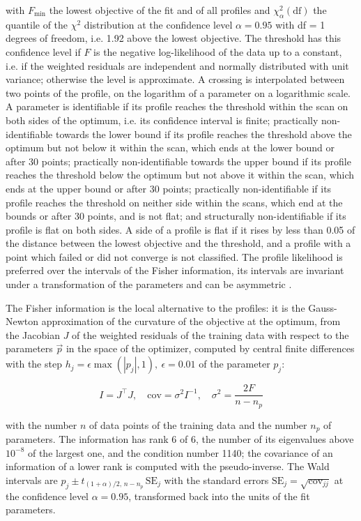 with $F_{\min}$ the lowest objective of the fit and of all profiles and $\chi^2_{\alpha}(\mathrm{df})$ the quantile of the $\chi^2$ distribution at the confidence level $\alpha = 0.95$ with df = 1 degrees of freedom, i.e. 1.92 above the lowest objective. The threshold has this confidence level if $F$ is the negative log-likelihood of the data up to a constant, i.e. if the weighted residuals are independent and normally distributed with unit variance; otherwise the level is approximate. A crossing is interpolated between two points of the profile, on the logarithm of a parameter on a logarithmic scale. A parameter is identifiable if its profile reaches the threshold within the scan on both sides of the optimum, i.e. its confidence interval is finite; practically non-identifiable towards the lower bound if its profile reaches the threshold above the optimum but not below it within the scan, which ends at the lower bound or after 30 points; practically non-identifiable towards the upper bound if its profile reaches the threshold below the optimum but not above it within the scan, which ends at the upper bound or after 30 points; practically non-identifiable if its profile reaches the threshold on neither side within the scans, which end at the bounds or after 30 points, and is not flat; and structurally non-identifiable if its profile is flat on both sides. A side of a profile is flat if it rises by less than 0.05 of the distance between the lowest objective and the threshold, and a profile with a point which failed or did not converge is not classified. The profile likelihood is preferred over the intervals of the Fisher information, its intervals are invariant under a transformation of the parameters and can be asymmetric \cite{Wieland2021}.

The Fisher information is the local alternative to the profiles: it is the Gauss-Newton approximation of the curvature of the objective at the optimum, from the Jacobian $J$ of the weighted residuals of the training data with respect to the parameters $\vec{p}$ in the space of the optimizer, computed by central finite differences with the step $h_j = \epsilon \max(|p_j|, 1),\ \epsilon = 0.01$ of the parameter $p_j$:

\begin{equation}
I = J^\top J, \quad \mathrm{cov} = \sigma^2 I^{-1}, \quad \sigma^2 = \frac{2 F}{n - n_p}
\end{equation}

with the number $n$ of data points of the training data and the number $n_p$ of parameters. The information has rank 6 of 6, the number of its eigenvalues above $10^{-8}$ of the largest one, and the condition number 1140; the covariance of an information of a lower rank is computed with the pseudo-inverse. The Wald intervals are $\hat{p}_j \pm t_{(1+\alpha)/2,\, n-n_p}\, \mathrm{SE}_j$ with the standard errors $\mathrm{SE}_j = \sqrt{\mathrm{cov}_{jj}}$ at the confidence level $\alpha = 0.95$, transformed back into the units of the fit parameters.

